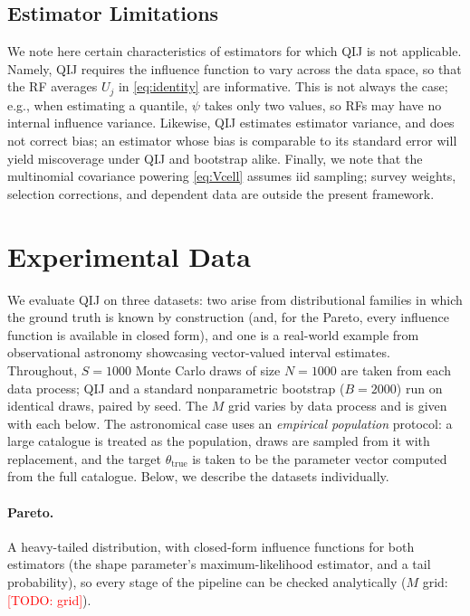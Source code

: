 \documentclass[runningheads]{llncs}
\newcommand{\todo}[1]{\textcolor{red}{[TODO: #1]}}
\newcommand{\ifl}{\psi}
\begin{document}
\subsection{Estimator Limitations}\label{sec:scope}

We note here certain characteristics of estimators for which QIJ is not applicable. Namely, QIJ requires the influence function to vary across the data space, so that the RF averages $U_j$ in \eqref{eq:identity} are informative. This is not always the case; e.g., when estimating a quantile, $\ifl$ takes only two values, so RFs may have no internal influence variance. Likewise, QIJ estimates estimator variance, and does not correct bias; an estimator whose bias is comparable to its standard error will yield miscoverage under QIJ and bootstrap alike. Finally, we note that the multinomial covariance powering \eqref{eq:Vcell} assumes iid sampling; survey weights, selection corrections, and dependent data are outside the present framework.


\section{Experimental Data}\label{sec:data}

We evaluate QIJ on three datasets: two arise from distributional families in which the ground truth is known by construction (and, for the Pareto, every influence function is available in closed form), and one is a real-world example from observational astronomy showcasing vector-valued interval estimates. Throughout, $S=1000$ Monte Carlo draws of size $N = 1000$ are taken from each data process; QIJ and a standard nonparametric bootstrap ($B = 2000$) run on identical draws, paired by seed. The $M$ grid varies by data process and is given with each below. The astronomical case uses an \emph{empirical population} protocol: a large catalogue is treated as the population, draws are sampled from it with replacement, and the target $\theta_{\mathrm{true}}$ is taken to be the parameter vector computed from the full catalogue. Below, we describe the datasets individually.

\paragraph{Pareto.} A heavy-tailed distribution, with closed-form influence functions for both estimators (the shape parameter's maximum-likelihood estimator, and a tail probability), so every stage of the pipeline can be checked analytically ($M$ grid: \todo{grid}).
\end{document}
